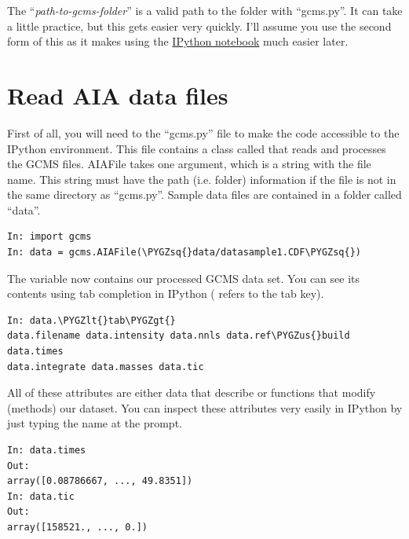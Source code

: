 \documentclass[letterpaper,10pt,english]{sphinxmanual}
\def\PYGZus{\char`\_}
\def\PYGZlt{\char`\<}
\def\PYGZgt{\char`\>}
\def\PYGZsq{\char`\'}
\begin{document}
The ``\emph{path-to-gcms-folder}'' is a valid path to the folder with ``gcms.py''. It
can take a little practice, but this gets easier very quickly. I'll assume you
use the second form of this as it makes using the \href{http://ipython.org/notebook.html}{IPython notebook} much
easier later.


\section{Read AIA data files}
\label{basics:read-aia-data-files}\label{basics:ipython-notebook}
First of all, you will need to  the ``gcms.py'' file to make the code
accessible to the IPython environment. This file contains a class called
 that reads and processes the GCMS files. AIAFile takes one
argument, which is a string with the file name. This string must have the path
(i.e.  folder) information if the file is not in the same directory as
``gcms.py''.  Sample data files are contained in a folder called ``data''.

\begin{Verbatim}[commandchars=\\\{\}]
In: import gcms
In: data = gcms.AIAFile(\PYGZsq{}data/datasample1.CDF\PYGZsq{})
\end{Verbatim}

The variable  now contains our processed GCMS data set. You can see
its contents using tab completion in IPython ( refers to the tab
key).

\begin{Verbatim}[commandchars=\\\{\}]
In: data.\PYGZlt{}tab\PYGZgt{}
data.filename data.intensity data.nnls data.ref\PYGZus{}build data.times
data.integrate data.masses data.tic
\end{Verbatim}

All of these attributes are either data that describe or functions that modify
(methods) our dataset. You can inspect these attributes very easily in
IPython by just typing the name at the prompt.

\begin{Verbatim}[commandchars=\\\{\}]
In: data.times
Out:
array([0.08786667, ..., 49.8351])
In: data.tic
Out:
array([158521., ..., 0.])
\end{Verbatim}
\end{document}
